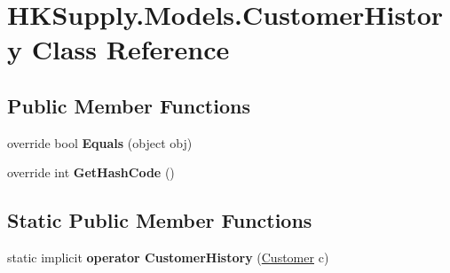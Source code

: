 \hypertarget{class_h_k_supply_1_1_models_1_1_customer_history}{}\section{H\+K\+Supply.\+Models.\+Customer\+History Class Reference}
\label{class_h_k_supply_1_1_models_1_1_customer_history}
\subsection*{Public Member Functions}
\begin{DoxyCompactItemize}
\item 
\mbox{\label{class_h_k_supply_1_1_models_1_1_customer_history_a7b1d5ad2746e1733fecebb4744187e22}} 
override bool {\bfseries Equals} (object obj)
\item 
\mbox{\label{class_h_k_supply_1_1_models_1_1_customer_history_a9ce1510ea0fc18dfb2797f758fbcb88e}} 
override int {\bfseries Get\+Hash\+Code} ()
\end{DoxyCompactItemize}
\subsection*{Static Public Member Functions}
\begin{DoxyCompactItemize}
\item 
\mbox{\label{class_h_k_supply_1_1_models_1_1_customer_history_a1d54538a20700d9fd1b68cf979830fad}} 
static implicit {\bfseries operator Customer\+History} (\hyperlink{class_h_k_supply_1_1_models_1_1_customer}{Customer} c)
\end{DoxyCompactItemize}
